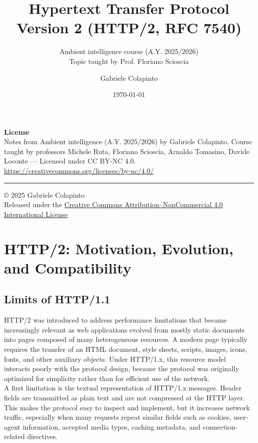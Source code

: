 \documentclass{scrbook}
\title{Hypertext Transfer Protocol Version 2 (HTTP/2, RFC 7540)}
\subtitle{Ambient intelligence course (A.Y. 2025/2026)\\Topic taught by Prof. Floriano Scioscia}
\author{Gabriele Colapinto}
\date{\today}
\begin{document}
	
	\maketitle
	\thispagestyle{empty}
	
	{\Large\textbf{License}} \\
	{Notes from Ambient intelligence (A.Y. 2025/2026) by Gabriele Colapinto. 
		Course taught by professors Michele Ruta, Floriano Scioscia, Arnaldo Tomasino, Davide Loconte — 
		Licensed under CC BY-NC 4.0.\\
		\url{https://creativecommons.org/licenses/by-nc/4.0/}}
	
	\vspace*{\fill}
	\rule{\textwidth}{0.2pt}
	\small{© 2025 Gabriele Colapinto \\
		Released under the \href{https://creativecommons.org/licenses/by-nc/4.0/}{Creative Commons Attribution–NonCommercial 4.0 International License}}
	
	\clearpage
	
	\tableofcontents

\chapter{HTTP/2: Motivation, Evolution, and Compatibility}

\section{Limits of HTTP/1.1}

HTTP/2 was introduced to address performance limitations that became increasingly relevant as web applications evolved from mostly static documents into pages composed of many heterogeneous resources. A modern page typically requires the transfer of an HTML document, style sheets, scripts, images, icons, fonts, and other auxiliary objects. Under HTTP/1.x, this resource model interacts poorly with the protocol design, because the protocol was originally optimized for simplicity rather than for efficient use of the network.\\

A first limitation is the textual representation of HTTP/1.x messages. Header fields are transmitted as plain text and are not compressed at the HTTP layer. This makes the protocol easy to inspect and implement, but it increases network traffic, especially when many requests repeat similar fields such as cookies, user-agent information, accepted media types, caching metadata, and connection-related directives.\\
\end{document}
